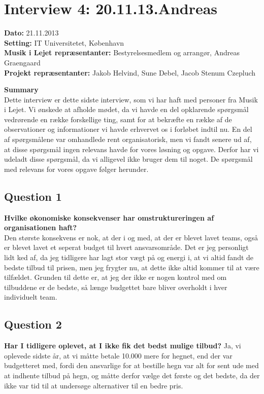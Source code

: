 \section{Interview 4: 20.11.13.Andreas}
\label{sec:interview_4}

\textbf{Dato:} 21.11.2013 \\
\textbf{Setting:} IT Universitetet, København \\
\textbf{Musik i Lejet repræsentanter:} Bestyrelsesmedlem og arrangør, Andreas Graengaard  \\
\textbf{Projekt repræsentanter:} Jakob Helvind, Sune Debel, Jacob Stenum Czepluch

\bigskip

\noindent \textbf{Summary} \\
Dette interview er dette sidste interview, som vi har haft med personer fra Musik i Lejet. Vi
ønskede at afholde mødet, da vi havde en del opklarende spørgsmål vedrørende en række forskellige
ting, samt for at bekræfte en række af de observationer og informationer vi havde erhvervet os i
forløbet indtil nu. En del af spørgsmålene var omhandlede \mil rent organisatorisk, men vi fandt
senere ud af, at disse spørgsmål ingen relevans havde for vores løsning og opgave. Derfor har vi
udeladt disse spørgsmål, da vi alligevel ikke bruger dem til noget. De spørgsmål med relevans for
vores opgave følger herunder.

\subsection{Question 1}
\label{sub:i4q1}
\noindent \textbf{Hvilke økonomiske konsekvenser har omstruktureringen af organisationen haft?} \\
Den største konsekvens er nok, at der i og med, at der er blevet lavet teams, også er blevet lavet
et seperat budget til hvert ansvarsområde. Det er jeg personligt lidt ked af, da jeg tidligere har
lagt stor vægt på og energi i, at vi altid fandt de bedste tilbud til prisen, men jeg frygter nu, at
dette ikke altid kommer til at være tilfældet. Grunden til dette er, at jeg der ikke er nogen
kontrol med om tilbuddene er de bedste, så længe budgettet bare bliver overholdt i hver individuelt
team.

\subsection{Question 2}
\label{sub:i4q2}
\noindent \textbf{Har I tidligere oplevet, at I ikke fik det bedst mulige tilbud?}
Ja, vi oplevede sidste år, at vi måtte betale 10.000 mere for hegnet, end der var budgetteret med,
fordi den ansvarlige for at bestille hegn var alt for sent ude med at indhente tilbud på hegn, og
måtte derfor vælge det første og det bedste, da der ikke var tid til at undersøge alternativer til
en bedre pris.

